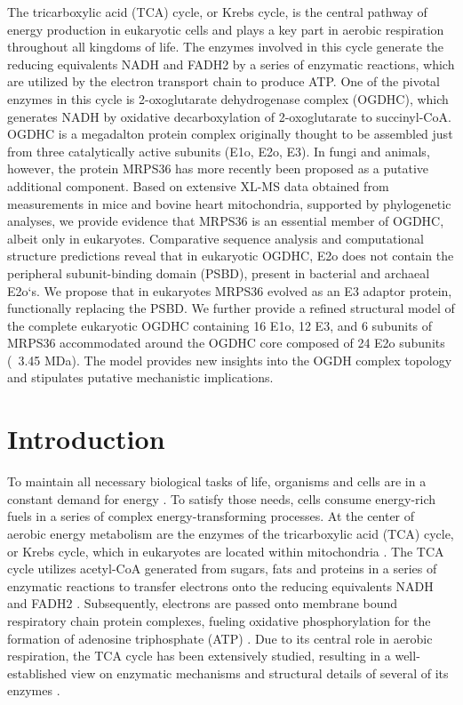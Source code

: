 \begin{abstract102}
	The tricarboxylic acid (TCA) cycle, or Krebs cycle, is the central pathway of energy production in eukaryotic cells and plays a key part in aerobic respiration throughout all kingdoms of life. The enzymes involved in this cycle generate the reducing equivalents NADH and FADH2 by a series of enzymatic reactions, which are utilized by the electron transport chain to produce ATP. One of the pivotal enzymes in this cycle is 2-oxoglutarate dehydrogenase complex (OGDHC), which generates NADH by oxidative decarboxylation of 2-oxoglutarate to succinyl-CoA. OGDHC is a megadalton protein complex originally thought to be assembled just from three catalytically active subunits (E1o, E2o, E3). In fungi and animals, however, the protein MRPS36 has more recently been proposed as a putative additional component. Based on extensive XL-MS data obtained from measurements in mice and bovine heart mitochondria, supported by phylogenetic analyses, we provide evidence that MRPS36 is an essential member of OGDHC, albeit only in eukaryotes. Comparative sequence analysis and computational structure predictions reveal that in eukaryotic OGDHC, E2o does not contain the peripheral subunit-binding domain (PSBD), present in bacterial and archaeal E2o`s. We propose that in eukaryotes MRPS36 evolved as an E3 adaptor protein, functionally replacing the PSBD. We further provide a refined structural model of the complete eukaryotic OGDHC containing 16 E1o, 12 E3, and 6 subunits of MRPS36 accommodated around the OGDHC core composed of 24 E2o subunits (~3.45 MDa). The model provides new insights into the OGDH complex topology and stipulates putative mechanistic implications.
\end{abstract102}
%
\section{Introduction}
To maintain all necessary biological tasks of life, organisms and cells are in a constant demand for energy \cite{Rigoulet_2020}. To satisfy those needs, cells consume energy-rich fuels in a series of complex energy-transforming processes. At the center of aerobic energy metabolism are the enzymes of the tricarboxylic acid (TCA) cycle, or Krebs cycle, which in eukaryotes are located within mitochondria \cite{Cavalcanti_2014,Martinez-Reyes_2020,Siriwat_2018}. The TCA cycle utilizes acetyl-CoA generated from sugars, fats and proteins in a series of enzymatic reactions to transfer electrons onto the reducing equivalents NADH and FADH2 \cite{Walsh_2018}. Subsequently, electrons are passed onto membrane bound respiratory chain protein complexes, fueling oxidative phosphorylation for the formation of adenosine triphosphate (ATP) \cite{Kaila_2021,Martinez-Reyes_2016}. Due to its central role in aerobic respiration, the TCA cycle has been extensively studied, resulting in a well-established view on enzymatic mechanisms and structural details of several of its enzymes \cite{Gleason_1994,Joyce_2000,Lauble_1992,Remington_1982,Spinelli_2018,Taylor_2008,Weaver_1996,Yankovskaya_2003}.

